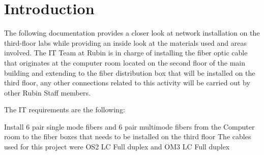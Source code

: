 \section{Introduction}


The following documentation provides a closer look at network installation on the third-floor labs while providing an inside look at the materials used and areas involved. The IT Team at Rubin is in charge of installing the fiber optic cable that originates at the computer room located on the second floor of the main building and extending to the fiber distribution box that will be installed on the third floor, any other connections related to this activity will be carried out by other Rubin Staff members.



The IT requirements are the following:

Install 6 pair single mode fibers and 6 pair multimode fibers from the Computer room to the fiber boxes that needs to be installed on the third floor	
The cables used for this project were OS2 LC Full duplex and OM3 LC Full duplex

